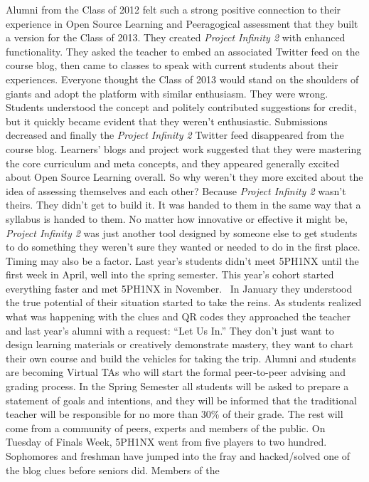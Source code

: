 Alumni from the Class of 2012 felt such a strong positive connection to
their experience in Open Source Learning and Peeragogical assessment
that they built a version for the Class of 2013. They created
\emph{Project Infinity 2} with enhanced functionality. They asked the
teacher to embed an associated Twitter feed on the course blog, then
came to classes to speak with current students about their experiences.
Everyone thought the Class of 2013 would stand on the shoulders of
giants and adopt the platform with similar enthusiasm. They were wrong.
Students understood the concept and politely contributed suggestions for
credit, but it quickly became evident that they weren't enthusiastic.
Submissions decreased and finally the \emph{Project Infinity 2} Twitter
feed disappeared from the course blog. Learners' blogs and project work
suggested that they were mastering the core curriculum and meta
concepts, and they appeared generally excited about Open Source Learning
overall. So why weren't they more excited about the idea of assessing
themselves and each other? Because \emph{Project Infinity 2} wasn't
theirs. They didn't get to build it. It was handed to them in the same
way that a syllabus is handed to them. No matter how innovative or
effective it might be, \emph{Project Infinity 2} was just another tool
designed by someone else to get students to do something they weren't
sure they wanted or needed to do in the first place. Timing may also be
a factor. Last year's students didn't meet 5PH1NX until the first week
in April, well into the spring semester. This year's cohort started
everything faster and met 5PH1NX in November.~ In January they
understood the true potential of their situation started to take the
reins. As students realized what was happening with the clues and QR
codes they approached the teacher and last year's alumni with a request:
``Let Us In.'' They don't just want to design learning materials or
creatively demonstrate mastery, they want to chart their own course and
build the vehicles for taking the trip. Alumni and students are becoming
Virtual TAs who will start the formal peer-to-peer advising and grading
process. In the Spring Semester all students will be asked to prepare a
statement of goals and intentions, and they will be informed that the
traditional teacher will be responsible for no more than 30\% of their
grade. The rest will come from a community of peers, experts and members
of the public. On Tuesday of Finals Week, 5PH1NX went from five players
to two hundred. Sophomores and freshman have jumped into the fray and
hacked/solved one of the blog clues before seniors did. Members of the
